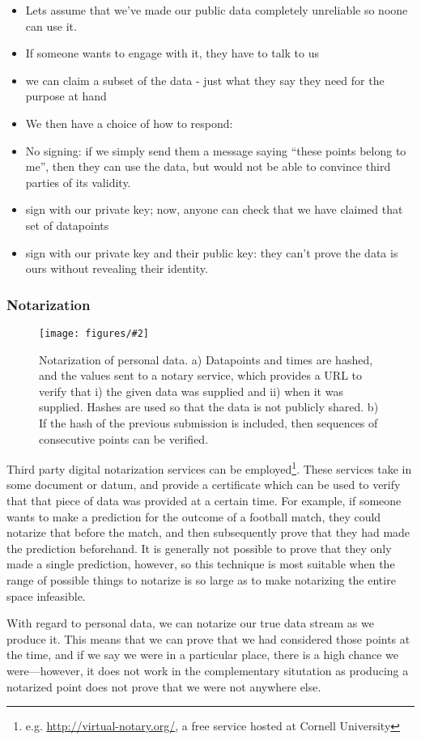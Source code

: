 \documentclass{IOS-Book-Article}     %
\newcommand{\fig}[3][0.9]{
\begin{figure}[tp]
\begin{center}
\texttt{[image: figures/\#2]}
\caption{#3}
\label{fig:#2}
\end{center}
\end{figure}
}
\begin{document}
\begin{itemize}
  \item Lets assume that we've made our public data completely unreliable so noone can
use it.
\item If someone wants to engage with it, they have to talk to us
\item we can claim a subset of the data - just what they say they need for the
purpose at hand
\item We then have a choice of how to respond:
\item No signing: if we simply send them a message saying ``these
points belong to me'', then they can use the data, but would not be able to
convince third parties of its validity.
\item sign with our private key; now, anyone can check that we have claimed that set of datapoints
\item sign with our private key and their public key: they can't prove the data
is ours without revealing their identity.
\end{itemize}

\subsubsection{Notarization}
\fig{Notarization}{Notarization of personal data. a) Datapoints and times are
hashed, and the values sent to a notary service, which provides a URL to verify
that i) the given data was supplied and ii) when it was supplied. Hashes are
used so that the data is not publicly shared. b) If the hash of the previous
submission is included, then sequences of consecutive points can be verified.}

Third party digital notarization services can be employed\footnote{e.g.
\url{http://virtual-notary.org/}, a free service hosted at Cornell University}.
These services take in some document or datum, and provide a certificate which
can be used to verify that that piece of data was provided at a certain time. For example, if someone wants to make a prediction
for the outcome of a football match, they could notarize that before the match,
and then subsequently prove that they had made the prediction beforehand. It is
generally not possible to prove that they only made a single prediction,
however, so this technique is most suitable when the range of possible things to notarize
is so large as to make notarizing the entire space infeasible.

With regard to personal data, we can notarize our true data stream as we produce
it. This means that we can prove that we had considered those points at the
time, and if we say we were in a particular place, there is a high chance we
were---however, it does not work in the complementary situtation as producing a
notarized point does not prove that we were not anywhere else.
\end{document}
